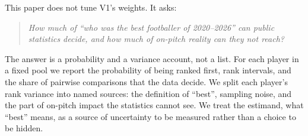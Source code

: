 \documentclass[11pt,a4paper]{article}
\begin{document}
This paper does not tune V1's weights. It asks:

\begin{quote}
\emph{How much of ``who was the best footballer of 2020--2026'' can public
statistics decide, and how much of on-pitch reality can they not reach?}
\end{quote}

The answer is a probability and a variance account, not a list. For each
player in a fixed pool we report the probability of being ranked first, rank
intervals, and the share of pairwise comparisons that the data decide. We
split each player's rank variance into named sources: the definition of
``best'', sampling noise, and the part of on-pitch impact the statistics
cannot see. We treat the estimand, what ``best'' means, as a source of
uncertainty to be measured rather than a choice to be hidden.
\end{document}
